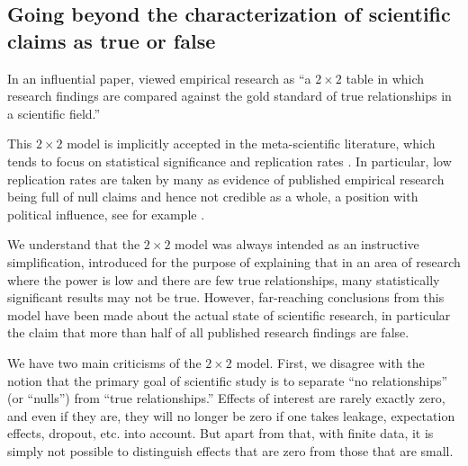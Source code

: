 \documentclass[11pt]{article}
\begin{document}
\subsection{Going beyond the characterization of scientific claims as true or false}

In an influential paper, \textcite{ioannidis2005most} viewed empirical research as ``a $2 \times 2$ table in which research findings are compared against the gold standard of true relationships in a scientific field.''

This $2 \times 2$ model is implicitly accepted in the meta-scientific literature, which tends to focus on statistical significance and replication rates \parencite{simmonsFalsePositivePsychologyUndisclosed2011, opensciencecollaborationEstimatingReproducibilityPsychological2015a, camerer2016evaluating}. In particular, low replication rates are taken by many as evidence of published empirical research being full of null claims and hence not credible as a whole, a position with political influence, see for example \textcite{garisto2025trump}.

We understand that the $2 \times 2$ model was always intended as an instructive simplification, introduced for the purpose of explaining that in an area of research where the power is low and there are few true relationships, many statistically significant results may not be true. However, far-reaching conclusions from this model have been made about the actual state of scientific research, in particular the claim that more than half of all published research findings are false.

We have two main criticisms of the $2 \times 2$ model. First, we disagree with the notion that the primary goal of scientific study is to separate ``no relationships'' (or ``nulls'') from ``true relationships.''  Effects of interest are rarely exactly zero, and even if they are, they will no longer be zero if one takes leakage, expectation effects, dropout, etc. into account. But apart from that, with finite data, it is simply not possible to distinguish effects that are zero from those that are small.
\end{document}
